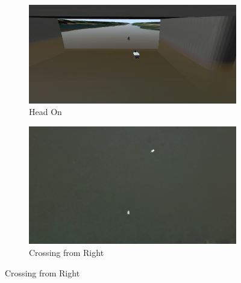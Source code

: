    \begin{figure}[H]
    \centering
    
        \begin{subfigure}[b]{0.5\textwidth}
            \centering
            \includegraphics[width=\textwidth]{figs/simulation_uwsim_headon_starting_pos.png}
            \caption{Head On}
            \label{fig:simulation_uwsim_headon_starting_pos}
        \end{subfigure}
        \begin{subfigure}[b]{0.45\textwidth}
            \centering
            \includegraphics[width=\textwidth]{figs/simulation_uwsim_crossingright_starting_pos.png}
            \caption{Crossing from Right}
            \label{fig:simulation_uwsim_crossingright_starting_pos}
        \end{subfigure}
        

\end{figure}
